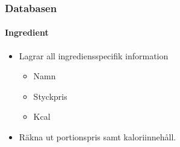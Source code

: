 
\begin{frame}
  \frametitle{Databasen}
  \framesubtitle{Ingredient}
  \begin{itemize}
  \item<1-> Lagrar all ingrediensspecifik information
    \begin{itemize}
    \item Namn 
    \item Styckpris
    \item Kcal
    \end{itemize}
  \item<2-> Räkna ut portionspris samt kaloriinnehåll.
  \end{itemize}
\end{frame}
